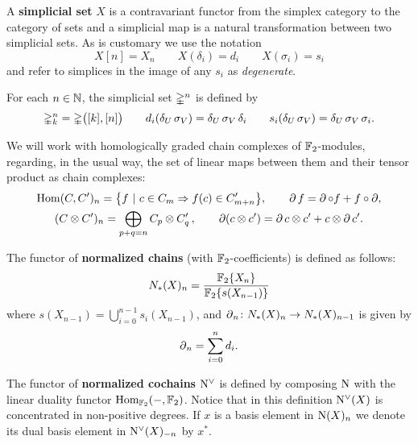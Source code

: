A \textbf{simplicial set} $X$ is a contravariant functor from the simplex category to the category of sets and a simplicial map is a natural transformation between two simplicial sets.
As is customary we use the notation
\[
X [n] = X_n \qquad X(\delta_i) = d_i \qquad X(\sigma_i) = s_i
\]
and refer to simplices in the image of any $s_i$ as \textit{degenerate}.

For each $n \in \mathbb{N}$, the simplicial set $\mathbb{\Delta}^n$ is defined by
\[
\mathbb{\Delta}^n_k = \mathbb{\Delta} \big( [k], [n] \big) \qquad
d_i(\delta_U\, \sigma_V) = \delta_U\, \sigma_V \, \delta_i \qquad
s_i(\delta_U\, \sigma_V) = \delta_U\, \sigma_V \, \sigma_i.
\]

We will work with homologically graded chain complexes of ${\mathbb{F}_2}$-modules, regarding, in the usual way, the set of linear maps between them and their tensor product as chain complexes:
\begin{gather*}
\mathrm{Hom}(C, C')_n = \big\{f \ |\ c\in C_m \Rightarrow f(c) \in C'_{m+n} \big\},
\qquad
\operatorname{\partial} f = \operatorname{\partial} \circ f + f \circ \operatorname{\partial}, \\
(C \otimes C^\prime)_n = \bigoplus_{p + q = n} C_p \otimes C^\prime_q \,,
\qquad
\operatorname{\partial} (c \otimes c^\prime) = \operatorname{\partial} c \otimes c^\prime + c \otimes \operatorname{\partial} c^\prime.
\end{gather*}

The functor of \textbf{normalized chains} (with ${\mathbb{F}_2}$-coefficients) is defined as follows:
\[
N_*(X)_n = \frac{{\mathbb{F}_2} \{ X_n \}}{{\mathbb{F}_2} \{ s(X_{n-1}) \}}
\]
where $s(X_{n-1}) = \bigcup_{i=0}^{n-1} s_i(X_{n-1})$, and $\operatorname{\partial}_n \colon N_*(X)_n \to N_*(X)_{n-1}$ is given by
\[
\operatorname{\partial}_n = \sum_{i = 0}^{n} d_{i}.
\]

The functor of \textbf{normalized cochains} $\operatorname{N^{\vee}}$ is defined by composing $\operatorname{N}$ with the linear duality functor $\mathrm{Hom}_{{\mathbb{F}_2}}(-, {\mathbb{F}_2})$.
Notice that in this definition $\operatorname{N^{\vee}}(X)$ is concentrated in non-positive degrees.
If $x$ is a basis element in $\operatorname{N}(X)_n$ we denote its dual basis element in $\operatorname{N^{\vee}}(X)_{-n}$ by $x^*$.